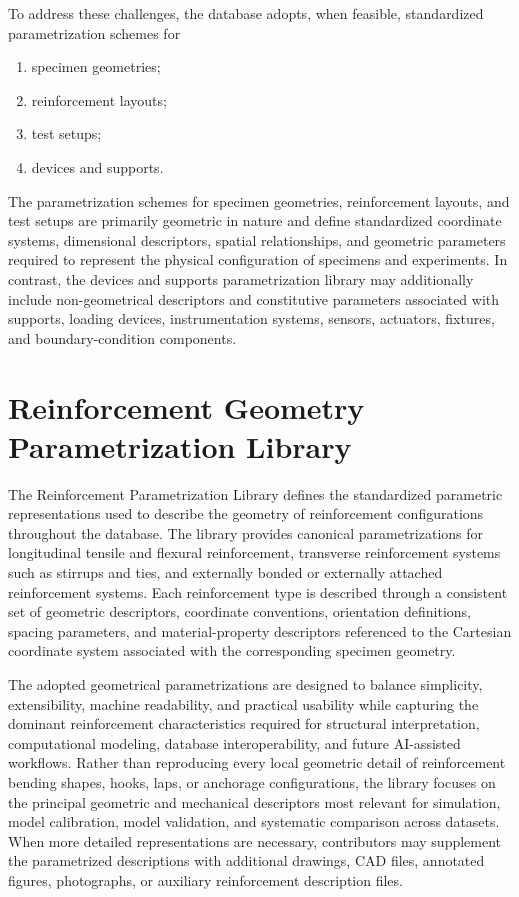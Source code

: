 \documentclass[11pt]{book}
\begin{document}
To address these challenges, the database adopts, when feasible, standardized parametrization schemes for

\begin{enumerate}
    \item specimen geometries;
    \item reinforcement layouts;
    \item test setups;
    \item devices and supports.
\end{enumerate}

The parametrization schemes for specimen geometries, reinforcement layouts, and test setups are primarily geometric in nature and define standardized coordinate systems, dimensional descriptors, spatial relationships, and geometric parameters required to represent the physical configuration of specimens and experiments. In contrast, the devices and supports parametrization library may additionally include non-geometrical descriptors and constitutive parameters associated with supports, loading devices, instrumentation systems, sensors, actuators, fixtures, and boundary-condition components.











\newpage
\section{Reinforcement Geometry Parametrization Library}
The Reinforcement Parametrization Library defines the standardized parametric representations used to describe the geometry of reinforcement configurations throughout the database. The library provides canonical parametrizations for longitudinal tensile and flexural reinforcement, transverse reinforcement systems such as stirrups and ties, and externally bonded or externally attached reinforcement systems. Each reinforcement type is described through a consistent set of geometric descriptors, coordinate conventions, orientation definitions, spacing parameters, and material-property descriptors referenced to the Cartesian coordinate system associated with the corresponding specimen geometry.

The adopted geometrical parametrizations are designed to balance simplicity, extensibility, machine readability, and practical usability while capturing the dominant reinforcement characteristics required for structural interpretation, computational modeling, database interoperability, and future AI-assisted workflows. Rather than reproducing every local geometric detail of reinforcement bending shapes, hooks, laps, or anchorage configurations, the library focuses on the principal geometric and mechanical descriptors most relevant for simulation, model calibration, model validation, and systematic comparison across datasets. When more detailed representations are necessary, contributors may supplement the parametrized descriptions with additional drawings, CAD files, annotated figures, photographs, or auxiliary reinforcement description files.
\end{document}
